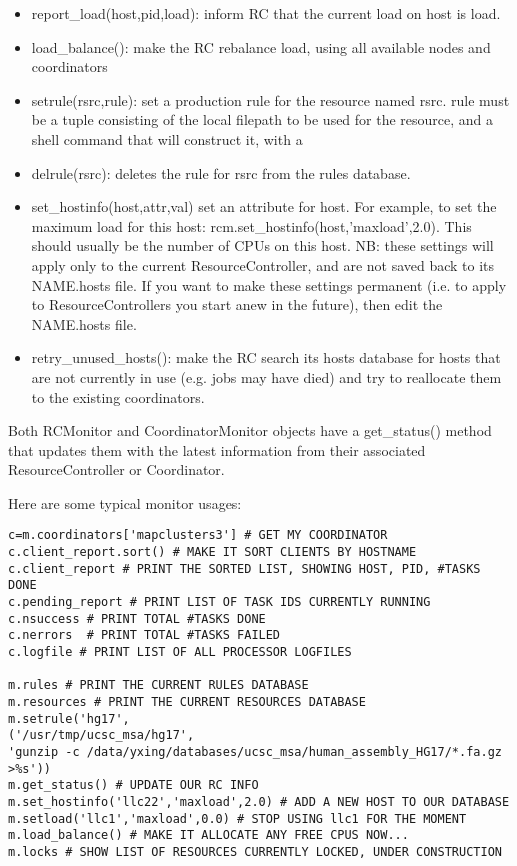\documentclass{howto}
\begin{document}
\begin{itemize}

\item
report_load(host,pid,load): inform RC that the current load on host is load.

\item
load_balance(): make the RC rebalance load, using all available nodes and coordinators

\item
setrule(rsrc,rule): set a production rule for the resource named rsrc.  rule must be a tuple consisting of the local filepath to be used for the resource, and a shell command that will construct it, with a %

\item
delrule(rsrc): deletes the rule for rsrc from the rules database.

\item
set_hostinfo(host,attr,val) set an attribute for host.  For example, to set the maximum load for this host: rcm.set_hostinfo(host,'maxload',2.0).  This should usually be the number of CPUs on this host.  NB: these settings will apply only to the current ResourceController, and are not saved back to its NAME.hosts file.  If you want to make these settings permanent (i.e. to apply to ResourceControllers you start anew in the future), then edit the NAME.hosts file.

\item
retry_unused_hosts(): make the RC search its hosts database for hosts that are not currently in use (e.g. jobs may have died) and try to reallocate them to the existing coordinators.

\end{itemize}
Both RCMonitor and CoordinatorMonitor objects have a get_status() method that updates them with the latest information from their associated ResourceController or Coordinator.

Here are some typical monitor usages:

\begin{verbatim}
c=m.coordinators['mapclusters3'] # GET MY COORDINATOR
c.client_report.sort() # MAKE IT SORT CLIENTS BY HOSTNAME
c.client_report # PRINT THE SORTED LIST, SHOWING HOST, PID, #TASKS DONE
c.pending_report # PRINT LIST OF TASK IDS CURRENTLY RUNNING
c.nsuccess # PRINT TOTAL #TASKS DONE
c.nerrors  # PRINT TOTAL #TASKS FAILED
c.logfile # PRINT LIST OF ALL PROCESSOR LOGFILES

m.rules # PRINT THE CURRENT RULES DATABASE
m.resources # PRINT THE CURRENT RESOURCES DATABASE
m.setrule('hg17',
('/usr/tmp/ucsc_msa/hg17',
'gunzip -c /data/yxing/databases/ucsc_msa/human_assembly_HG17/*.fa.gz
>%s'))
m.get_status() # UPDATE OUR RC INFO
m.set_hostinfo('llc22','maxload',2.0) # ADD A NEW HOST TO OUR DATABASE
m.setload('llc1','maxload',0.0) # STOP USING llc1 FOR THE MOMENT
m.load_balance() # MAKE IT ALLOCATE ANY FREE CPUS NOW...
m.locks # SHOW LIST OF RESOURCES CURRENTLY LOCKED, UNDER CONSTRUCTION
\end{verbatim}
\end{document}

